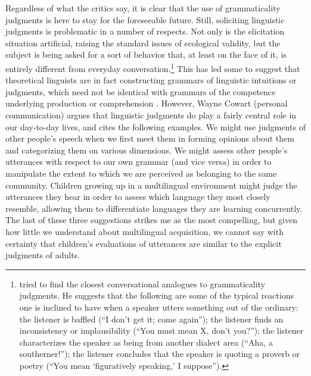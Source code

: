 Regardless of what the critics say, it is clear that the use of grammaticality judgments is here to stay for the foreseeable future. Still, soliciting linguistic judgments is problematic in a number of respects. Not only is the elicitation situation artificial, raising the standard issues of ecological validity, but the subject is being asked for a sort of behavior that, at least on the face of it, is entirely different from
everyday conversation.\footnote{\citet{Householder1971,Householder1973} tried to find the closest conversational analogues to grammaticality judgments. He suggests that the following are some of the typical reactions one is inclined to have when a speaker utters something out of the ordinary: the listener is baffled (``I don't get it; come again''); the listener finds an inconsistency or implausibility (``You must mean X, don't you?''); the listener characterizes the speaker as being from another dialect area (``Aha, a southerner!''); the listener concludes that the speaker is quoting a proverb or poetry (``You mean `figuratively speaking,' I suppose'').
}
 This has led some to suggest that theoretical linguists are in fact constructing grammars of linguistic intuitions or judgments, which need not be identical with grammars of the competence underlying production or comprehension \citep{Bever1970a,Birdsong1989,GleitmanEtAl1979}. However, Wayne Cowart (personal communication) argues that linguistic judgments do play a fairly central role in our day-to-day lives, and cites the following examples. We might use judgments of other people's speech when we first meet them in forming opinions about them and categorizing them on various dimensions. We might assess other people's utterances with respect to our own grammar (and vice versa) in order to manipulate the extent to which we are perceived as belonging to the same community. Children growing up in a multilingual environment might judge the utterances they hear in order to assess which language they most closely resemble, allowing them to differentiate languages they are learning concurrently. The last of these three suggestions strikes me as the most compelling, but given how little we understand about multilingual acquisition, we cannot say with certainty that children's evaluations of utterances are similar to the explicit judgments of adults.

